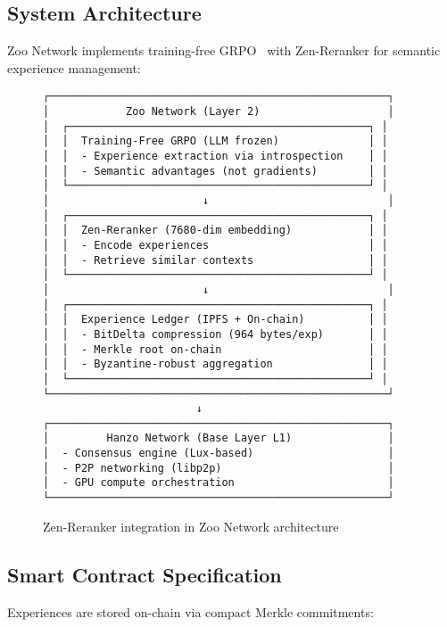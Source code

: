 \documentclass[11pt,a4paper]{article}
\begin{document}
\subsection{System Architecture}

Zoo Network implements training-free GRPO~\cite{tencent2025grpo} with Zen-Reranker for semantic experience management:

\begin{figure}[h]
\centering
\begin{verbatim}
┌─────────────────────────────────────────────────────┐
│            Zoo Network (Layer 2)                    │
│  ┌───────────────────────────────────────────────┐ │
│  │  Training-Free GRPO (LLM frozen)              │ │
│  │  - Experience extraction via introspection    │ │
│  │  - Semantic advantages (not gradients)        │ │
│  └───────────────────────────────────────────────┘ │
│                        ↓                            │
│  ┌───────────────────────────────────────────────┐ │
│  │  Zen-Reranker (7680-dim embedding)            │ │
│  │  - Encode experiences                         │ │
│  │  - Retrieve similar contexts                  │ │
│  └───────────────────────────────────────────────┘ │
│                        ↓                            │
│  ┌───────────────────────────────────────────────┐ │
│  │  Experience Ledger (IPFS + On-chain)          │ │
│  │  - BitDelta compression (964 bytes/exp)       │ │
│  │  - Merkle root on-chain                       │ │
│  │  - Byzantine-robust aggregation               │ │
│  └───────────────────────────────────────────────┘ │
└─────────────────────────────────────────────────────┘
                        ↓
┌─────────────────────────────────────────────────────┐
│         Hanzo Network (Base Layer L1)               │
│  - Consensus engine (Lux-based)                     │
│  - P2P networking (libp2p)                          │
│  - GPU compute orchestration                        │
└─────────────────────────────────────────────────────┘
\end{verbatim}
\caption{Zen-Reranker integration in Zoo Network architecture}
\end{figure}

\subsection{Smart Contract Specification}

Experiences are stored on-chain via compact Merkle commitments:
\end{document}
